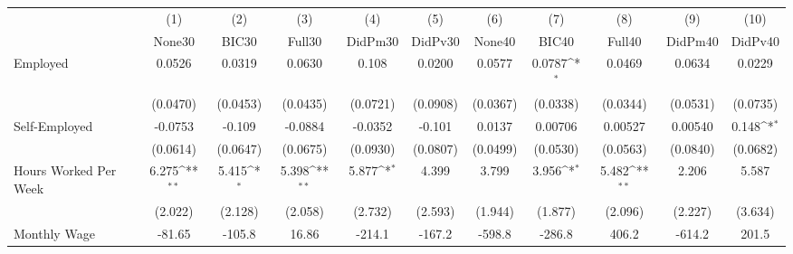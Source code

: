 {
\def\sym#1{\ifmmode^{#1}\else\(^{#1}\)\fi}
\begin{tabular}{l*{10}{c}}
\toprule
            &\multicolumn{1}{c}{(1)}&\multicolumn{1}{c}{(2)}&\multicolumn{1}{c}{(3)}&\multicolumn{1}{c}{(4)}&\multicolumn{1}{c}{(5)}&\multicolumn{1}{c}{(6)}&\multicolumn{1}{c}{(7)}&\multicolumn{1}{c}{(8)}&\multicolumn{1}{c}{(9)}&\multicolumn{1}{c}{(10)}\\
            &\multicolumn{1}{c}{None30}&\multicolumn{1}{c}{BIC30}&\multicolumn{1}{c}{Full30}&\multicolumn{1}{c}{DidPm30}&\multicolumn{1}{c}{DidPv30}&\multicolumn{1}{c}{None40}&\multicolumn{1}{c}{BIC40}&\multicolumn{1}{c}{Full40}&\multicolumn{1}{c}{DidPm40}&\multicolumn{1}{c}{DidPv40}\\
\midrule
Employed    &      0.0526         &      0.0319         &      0.0630         &       0.108         &      0.0200         &      0.0577         &      0.0787\sym{*}  &      0.0469         &      0.0634         &      0.0229         \\
            &    (0.0470)         &    (0.0453)         &    (0.0435)         &    (0.0721)         &    (0.0908)         &    (0.0367)         &    (0.0338)         &    (0.0344)         &    (0.0531)         &    (0.0735)         \\
\addlinespace
Self-Employed&     -0.0753         &      -0.109         &     -0.0884         &     -0.0352         &      -0.101         &      0.0137         &     0.00706         &     0.00527         &     0.00540         &       0.148\sym{*}  \\
            &    (0.0614)         &    (0.0647)         &    (0.0675)         &    (0.0930)         &    (0.0807)         &    (0.0499)         &    (0.0530)         &    (0.0563)         &    (0.0840)         &    (0.0682)         \\
\addlinespace
Hours Worked Per Week&       6.275\sym{**} &       5.415\sym{*}  &       5.398\sym{**} &       5.877\sym{*}  &       4.399         &       3.799         &       3.956\sym{*}  &       5.482\sym{**} &       2.206         &       5.587         \\
            &     (2.022)         &     (2.128)         &     (2.058)         &     (2.732)         &     (2.593)         &     (1.944)         &     (1.877)         &     (2.096)         &     (2.227)         &     (3.634)         \\
\addlinespace
Monthly Wage&      -81.65         &      -105.8         &       16.86         &      -214.1         &      -167.2         &      -598.8         &      -286.8         &       406.2         &      -614.2         &       201.5         \\

\end{tabular}}
